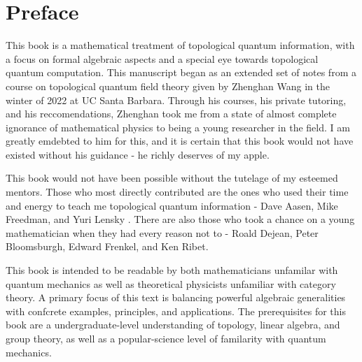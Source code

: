 \section{Preface}
\label{Preface}

This book is a mathematical treatment of topological quantum information, with a focus on formal algebraic aspects and a special eye towards topological quantum computation. This manuscript began as an extended set of notes from a course on topological quantum field theory given by Zhenghan Wang in the winter of 2022 at UC Santa Barbara. Through his courses, his private tutoring, and his reccomendations, Zhenghan took me from a state of almost complete ignorance of mathematical physics to being a young researcher in the field. I am greatly emdebted to him for this, and it is certain that this book would not have existed without his guidance - he richly deserves of my apple.

This book would not have been possible without the tutelage of my esteemed mentors. Those who most directly contributed are the ones who used their time and energy to teach me topological quantum information - Dave Aasen, Mike Freedman, and Yuri Lensky . There are also those who took a chance on a young mathematician when they had every reason not to - Roald Dejean, Peter Bloomsburgh, Edward Frenkel, and Ken Ribet.


This book is intended to be readable by both mathematicians unfamilar with quantum mechanics as well as theoretical physicists unfamiliar with category theory. A primary focus of this text is balancing powerful algebraic generalities with confcrete examples, principles, and applications. The prerequisites for this book are a undergraduate-level understanding of topology, linear algebra, and group theory, as well as a popular-science level of familarity with quantum mechanics.

